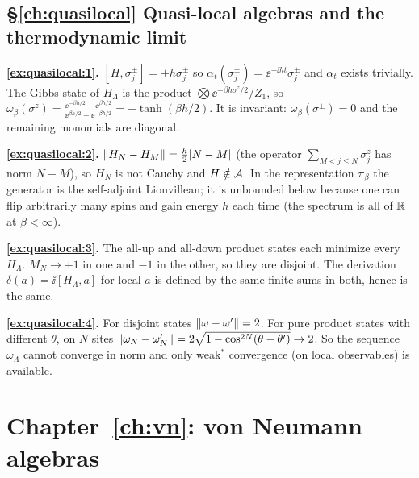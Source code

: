 {\subsection*{\S\ref{ch:quasilocal} Quasi-local algebras and the thermodynamic limit}
\textbf{\ref{ex:quasilocal:1}.} $[H,\sigma^\pm_j]=\pm h\sigma^\pm_j$ so $\alpha_t(\sigma^\pm_j)=\ee^{\pm\ii ht}\sigma^\pm_j$ and $\alpha_t$ exists trivially. The Gibbs state of $H_\Lambda$ is the product $\bigotimes\ee^{-\beta h\sigma^z/2}/Z_1$, so $\omega_\beta(\sigma^z)=\frac{\ee^{-\beta h/2}-\ee^{\beta h/2}}{\ee^{\beta h/2}+\ee^{-\beta h/2}}=-\tanh(\beta h/2)$. It is invariant: $\omega_\beta(\sigma^\pm)=0$ and the remaining monomials are diagonal.\par
\textbf{\ref{ex:quasilocal:2}.} $\lVert H_N-H_M\rVert=\frac h2|N-M|$ (the operator $\sum_{M<j\le N}\sigma^z_j$ has norm $N-M$), so $H_N$ is not Cauchy and $H\notin\mathcal{A}$. In the representation $\pi_\beta$ the generator is the self-adjoint Liouvillean; it is unbounded below because one can flip arbitrarily many spins and gain energy $h$ each time (the spectrum is all of $\mathbb{R}$ at $\beta<\infty$).\par
\textbf{\ref{ex:quasilocal:3}.} The all-up and all-down product states each minimize every $H_\Lambda$. $M_N\to+1$ in one and $-1$ in the other, so they are disjoint. The derivation $\delta(a)=\ii[H_\Lambda,a]$ for local $a$ is defined by the same finite sums in both, hence is the same.\par
\textbf{\ref{ex:quasilocal:4}.} For disjoint states $\lVert \omega-\omega'\rVert=2$. For pure product states with different $\theta$, on $N$ sites $\lVert \omega_N-\omega'_N\rVert=2\sqrt{1-\cos^{2N}(\theta-\theta')}\to2$. So the sequence $\omega_\Lambda$ cannot converge in norm and only weak$^*$ convergence (on local observables) is available.\par

\section*{Chapter~\ref{ch:vn}: von Neumann algebras}

}
